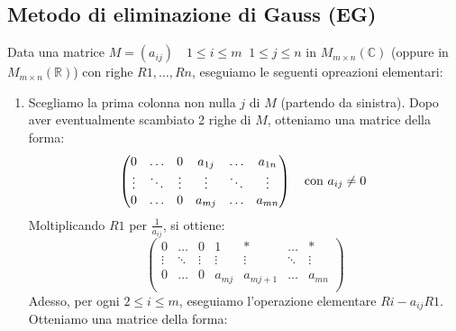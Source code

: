\documentclass[a4paper]{article}
\theoremstyle{break}
\theoremstyle{break}
\theoremstyle{break}
\theoremstyle{break}
\begin{document}
\subsection{Metodo di eliminazione di Gauss (EG)}
Data una matrice \( M = (a_{ij}) \quad 1 \le i \le m \;\; 1 \le j \le n \) in \( M_{m \times n}(\mathbb{C}) \)
(oppure in \( M_{m \times n}(\mathbb{R}) \)) con righe \( R1, \ldots, Rn \), eseguiamo le
seguenti opreazioni elementari:
\begin{enumerate}
\item Scegliamo la prima colonna non nulla \( j \) di \( M \) (partendo da sinistra).
  Dopo aver eventualmente scambiato 2 righe di \( M \), otteniamo una matrice
  della forma:
  \[
    \begin{pmatrix}
      0      & \ldots & 0      & a_{1j} & \ldots & a_{1n} \\
      \vdots & \ddots & \vdots & \vdots & \ddots & \vdots \\
      0      & \ldots & 0      & a_{mj} & \ldots & a_{mn} \\
    \end{pmatrix} \quad \text{con \( a_{ij} \neq 0 \) }
  \]
  Moltiplicando \( R1 \) per \( \frac{1}{a_{ij}} \), si ottiene:
  \[
    \begin{pmatrix}
      0      & \ldots & 0      & 1      & *        & \ldots & *      \\
      \vdots & \ddots & \vdots & \vdots & \vdots   & \ddots & \vdots \\
      0      & \ldots & 0      & a_{mj} & a_{mj+1} & \ldots & a_{mn} \\
    \end{pmatrix}
  \]
  Adesso, per ogni \( 2 \le i \le m \), eseguiamo l'operazione elementare \( Ri - a_{ij}R1 \).
  Otteniamo una matrice della forma:
  \begin{figure}[H]
    \centering
\end{figure}
\end{enumerate}
\end{document}
